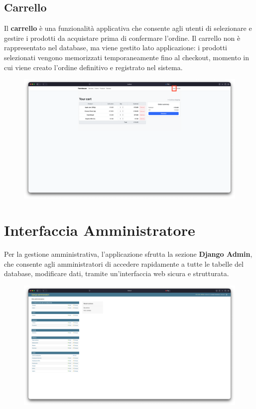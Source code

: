 \documentclass[a4paper,12pt]{report}
\begin{document}
\subsection*{Carrello}
Il \textbf{carrello} è una funzionalità applicativa che consente agli
utenti di selezionare e
gestire i prodotti da acquistare prima di confermare l'ordine. Il
carrello non è rappresentato
nel database, ma viene gestito lato applicazione: i prodotti
selezionati vengono memorizzati
temporaneamente fino al checkout, momento in cui viene creato
l'ordine definitivo e
registrato nel sistema.

\begin{figure}[H]
  \centering
  \includegraphics[width=\textwidth, trim=0 0 0 0]{./img/users/cart.png}
  \vspace{-1em}
  \label{fig:cart}
\end{figure}

\newpage
\section{Interfaccia Amministratore}
Per la gestione amministrativa, l'applicazione sfrutta la sezione
\textbf{Django Admin},
che consente agli amministratori di accedere rapidamente a tutte le
tabelle del database,
modificare dati, tramite un'interfaccia web sicura e strutturata.

\begin{figure}[H]
  \centering
  \includegraphics[width=\textwidth, trim=0 0 0 0]{./img/admin/djangoAdmin.png}
  \vspace{-1em}
  \label{fig:django-admin}
\end{figure}
\end{document}
